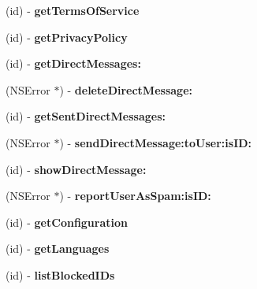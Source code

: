 \begin{DoxyCompactItemize}
(id) -\/ {\bfseries get\+Terms\+Of\+Service}
\item 
\mbox{\label{interfaceFHSTwitterEngine_a6d5b9bffe00a91d69a009f67e51a4385}} 
(id) -\/ {\bfseries get\+Privacy\+Policy}
\item 
\mbox{\label{interfaceFHSTwitterEngine_a826b1412137c8f3550dce3699b1d92cf}} 
(id) -\/ {\bfseries get\+Direct\+Messages\+:}
\item 
\mbox{\label{interfaceFHSTwitterEngine_ad8c01f76d77ce4e86ce7e3e977d2532c}} 
(N\+S\+Error $\ast$) -\/ {\bfseries delete\+Direct\+Message\+:}
\item 
\mbox{\label{interfaceFHSTwitterEngine_a91e56570e4589520967a006bbf6d382d}} 
(id) -\/ {\bfseries get\+Sent\+Direct\+Messages\+:}
\item 
\mbox{\label{interfaceFHSTwitterEngine_a424a87f62892cb0b7a3a84eb68872751}} 
(N\+S\+Error $\ast$) -\/ {\bfseries send\+Direct\+Message\+:to\+User\+:is\+I\+D\+:}
\item 
\mbox{\label{interfaceFHSTwitterEngine_a842435f19ef3665f5a4c72c7278e3330}} 
(id) -\/ {\bfseries show\+Direct\+Message\+:}
\item 
\mbox{\label{interfaceFHSTwitterEngine_ac0618be68eb3edf859f52bfd83a3b75c}} 
(N\+S\+Error $\ast$) -\/ {\bfseries report\+User\+As\+Spam\+:is\+I\+D\+:}
\item 
\mbox{\label{interfaceFHSTwitterEngine_ab85d1bc02833bcaaa9978ed343810fe2}} 
(id) -\/ {\bfseries get\+Configuration}
\item 
\mbox{\label{interfaceFHSTwitterEngine_a6378aa04ea140d88e21bf75e31b1ca0d}} 
(id) -\/ {\bfseries get\+Languages}
\item 
\mbox{\label{interfaceFHSTwitterEngine_ae467fddfacf2877d5244f1b7d107c4c4}} 
(id) -\/ {\bfseries list\+Blocked\+I\+Ds}
\item 
\mbox{\label{interfaceFHSTwitterEngine_a6f0542702206b945a7dd8b29dee7c652}} 

\end{DoxyCompactItemize}
